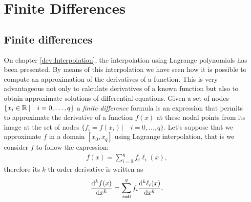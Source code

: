 
    \chapter{Finite Differences }
    \label{Dev:Finite Differences}
    
 
    \section{Finite differences}
 
     On chapter \ref{dev:Interpolation}, the interpolation using Lagrange polynomials has been presented. By means of this interpolation we have seen how it is possible to compute an approximation of the derivatives of a function. This is very advantageous not only to calculate derivatives of a known function but also to obtain approximate solutions of differential equations. Given a set of nodes $\{x_i \in \mathbb{R}^{} \, |\quad i = 0,\ldots,q\}$ a \textit{finite difference} formula is an expression that permits to approximate the derivative of a function $f(x)$ at these nodal points from its image at the set of nodes $\{f_i=f(x_i) \, |\quad i = 0,\ldots,q\}$. Let's suppose that we approximate $f$ in a domain $[x_0,x_q]$ using Lagrange interpolation, that is we consider $f$ to follow the expression:
     \begin{align}
     	f(x) = \sum_{i=0}^{q} f_i\ell_i(x),
     \end{align}
    therefore its $k$-th order derivative is written as
    \begin{align}
    \dv[k]{f(x)}{x}= \sum_{i=0}^{q} f_i\dv[k]{\ell_i(x)}{x}.
    \label{eq:Derivative_k_finite_difference}
    \end{align}
    
